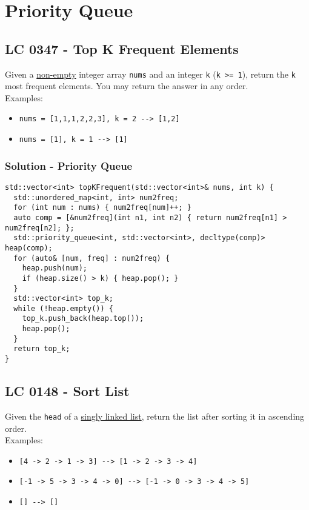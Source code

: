 \chapter{Priority Queue}
\section{LC 0347 - Top K Frequent Elements}
Given a \ul{non-empty} integer array {\colorbox{CodeBackground}{\lstinline|nums|}} and an integer {\colorbox{CodeBackground}{\lstinline|k|}} ({\colorbox{CodeBackground}{\lstinline|k >= 1|}}), return the {\colorbox{CodeBackground}{\lstinline|k|}} most frequent elements. You may return the answer in any order.\\

Examples:
\begin{itemize}
\item {\colorbox{CodeBackground}{\lstinline|nums = [1,1,1,2,2,3], k = 2 --> [1,2]|}}
\item {\colorbox{CodeBackground}{\lstinline|nums = [1], k = 1 --> [1]|}}
\end{itemize}

\subsection*{Solution - Priority Queue}
\begin{lstlisting}
std::vector<int> topKFrequent(std::vector<int>& nums, int k) {
  std::unordered_map<int, int> num2freq;
  for (int num : nums) { num2freq[num]++; }
  auto comp = [&num2freq](int n1, int n2) { return num2freq[n1] > num2freq[n2]; };
  std::priority_queue<int, std::vector<int>, decltype(comp)> heap(comp);
  for (auto& [num, freq] : num2freq) {
    heap.push(num);
    if (heap.size() > k) { heap.pop(); }
  }
  std::vector<int> top_k;
  while (!heap.empty()) {
    top_k.push_back(heap.top());
    heap.pop();
  }
  return top_k;
}
\end{lstlisting}

\section{LC 0148 - Sort List}
Given the {\colorbox{CodeBackground}{\lstinline|head|}} of a \ul{singly linked list}, return the list after sorting it in ascending order.\\

Examples:
\begin{itemize}
\item {\colorbox{CodeBackground}{\lstinline|[4 -> 2 -> 1 -> 3] --> [1 -> 2 -> 3 -> 4]|}}
\item {\colorbox{CodeBackground}{\lstinline|[-1 -> 5 -> 3 -> 4 -> 0] --> [-1 -> 0 -> 3 -> 4 -> 5]|}}
\item {\colorbox{CodeBackground}{\lstinline|[] --> []|}}
\end{itemize}

